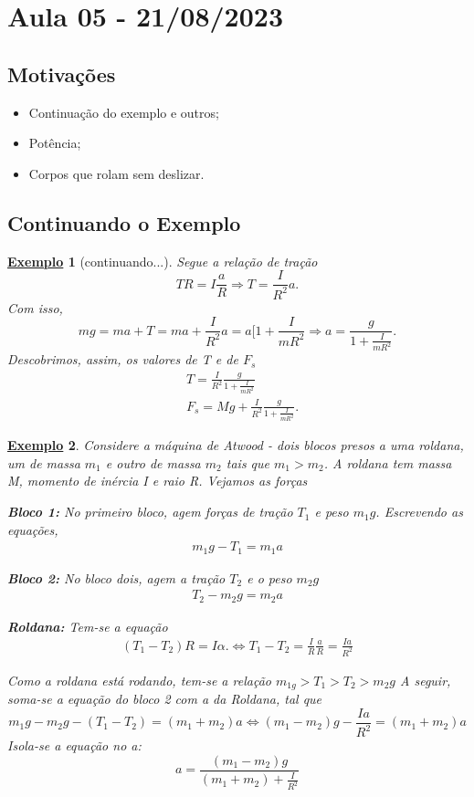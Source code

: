 \documentclass{article}
\newtheorem{example}{\underline{Exemplo}}
\begin{document}
\section{Aula 05 - 21/08/2023}
\subsection{Motivações}
\begin{itemize}
  \item Continuação do exemplo e outros;
  \item Potência;
  \item Corpos que rolam sem deslizar.
\end{itemize}
\subsection{Continuando o Exemplo}
\begin{example}[continuando...]
  Segue a relação de tração 
    \[
      TR = I \frac{a}{R} \Rightarrow T = \frac{I}{R^{2}}a.
    \] 
  Com isso, 
    \[
      mg = ma + T = ma + \frac{I}{R^{2}}a = a[1 + \frac{I}{mR^{2}} \Rightarrow a = \frac{g}{1 + \frac{I}{mR^{2}}}.
    \]
  Descobrimos, assim, os valores de T e de \(F_{s}\)
 \begin{align*}
   &T = \frac{I}{R^{2}}\frac{g}{1+ \frac{I}{mR^{2}}}\\
   &F_{s} = Mg + \frac{I}{R^{2}}\frac{g}{1+\frac{I}{mR^{2}}}.
 \end{align*}
 \end{example} 
\begin{example}
  Considere a máquina de Atwood - dois blocos presos a uma roldana, um de massa \(m_{1}\) e outro de massa \(m_{2}\) tais que \(m_{1} > m_{2}\).
A roldana tem massa M, momento de inércia I e raio R. Vejamos as forças

  \textbf{Bloco 1:}
    No primeiro bloco, agem forças de tração \(T_{1}\) e peso \(m_{1}g\). Escrevendo as equações,
   \begin{align*}
     m_{1}g - T_{1} = m_{1}a
   \end{align*}

  \textbf{Bloco 2:}
    No bloco dois, agem a tração \(T_{2}\) e o peso \(m_{2}g\)
   \begin{align*}
     T_{2}-m_{2}g = m_{2}a
   \end{align*}

  \textbf{Roldana:}
    Tem-se a equação 
   \begin{align*}
     (T_{1} - T_{2})R = I\alpha. \Longleftrightarrow T_{1} - T_{2} = \frac{I}{R}\frac{a}{R} = \frac{Ia}{R^{2}}
   \end{align*}

  Como a roldana está rodando, tem-se a relação \(m_{1g} > T_{1} > T_{2} > m_{2}g\)
A seguir, soma-se a equação do bloco 2 com a da Roldana, tal que 
  \[
    m_{1}g - m_{2}g - (T_{1}-T_{2}) = (m_{1}+m_{2})a \Longleftrightarrow (m_{1}-m_{2})g - \frac{Ia}{R^{2}} = (m_{1}+m_{2})a
  \]
  Isola-se a equação no a: 
    \[
      a = \frac{(m_{1}-m_{2})g}{(m_{1}+m_{2})+\frac{I}{R^{2}}}
    \]
\end{example}
\end{document}
